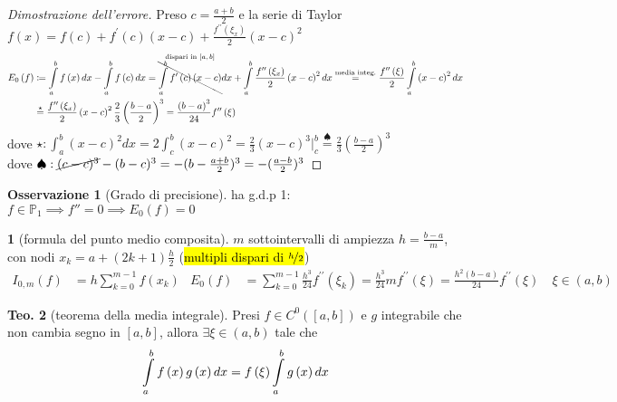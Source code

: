 \documentclass[a4paper,10pt]{article}
\theoremstyle{definition}
\theoremstyle{indentdefinition}
\theoremstyle{indenttheorem}
\newtheorem{thm}{Teo.}
\theoremstyle{myremark}
\newtheorem*{rem*}{Osservazione}
\theoremstyle{indentgeneral}
\newtheorem{lyxalgorithm}[thm]{\protect\algorithmname}
\theoremstyle{plain}
\theoremstyle{plain}
\begin{document}
\begin{proof}[Dimostrazione dell'errore]
Preso $c=\frac{a+b}{2}$ e la serie di Taylor $f\left(x\right)=f\left(c\right)+f^{\prime}\left(c\right)\left(x-c\right)+\frac{f^{\prime\prime}\left(\xi_{x}\right)}{2}\left(x-c\right)^{2}$
\begin{align*}
E_{0}\left(f\right)&\coloneqq\intop_{a}^{b}f\left(x\right)dx-\intop_{a}^{b}f\left(c\right)dx=\overset{\text{dispari in \ensuremath{\left[a,b\right]}}}{\bcancel{\intop_{a}^{b}f^{\prime}\left(c\right)\left(x-c\right)}}dx+\intop_{a}^{b}\frac{f^{\prime\prime}\left(\xi_{x}\right)}{2}\left(x-c\right)^{2}dx\overset{\text{media integ.}}{=}\frac{f^{\prime\prime}\left(\xi\right)}{2}\intop_{a}^{b}\left(x-c\right)^{2}dx\\
&\overset{\star}{=}\frac{f^{\prime\prime}\left(\xi_{x}\right)}{2}\left(x-c\right)^{2} \frac{2}{3}\left(\frac{b-a}{2}\right)^3=\frac{\left(b-a\right)^{3}}{24}f^{\prime\prime}\left(\xi\right)
\end{align*}
dove $\star: \int_a^b(x-c)^2dx=2\int_c^b(x-c)^2=\frac{2}{3}(x-c)^3|_c^b\overset{\spadesuit}{=} \frac{2}{3}\left(\frac{b-a}{2}\right)^3$ \\
dove $\spadesuit: \cancel{(c-c)^3}-(b-c)^3=-(b-\frac{a+b}{2})^3=-(\frac{a-b}{2})^3$
\end{proof}
\begin{rem*}[Grado di precisione] ha g.d.p 1: $f\in\mathbb{P}_1\implies f''=0\implies E_0(f)=0$
    
\end{rem*}
\begin{lyxalgorithm}[formula del punto medio composita] $m$ sottointervalli di ampiezza 
$h=\frac{b-a}{m}$, con nodi $x_{k}=a+\left(2k+1\right)\frac{h}{2}$ (\hl{multipli dispari di $\nicefrac{h}{2}$})
\begin{align*}
I_{0,m}\left(f\right) & =h\sum_{k=0}^{m-1}f\left(x_{k}\right) & E_{0}\left(f\right) & =\sum_{k=0}^{m-1}\frac{h^{3}}{24}f^{\prime\prime}\left(\xi_{k}\right)=\frac{h^{3}}{24}mf^{\prime\prime}\left(\xi\right)=\frac{h^{2}\left(b-a\right)}{24}f^{\prime\prime}\left(\xi\right)\quad\xi\in\left(a,b\right)
\end{align*}
\end{lyxalgorithm}

\begin{thm}[teorema della media integrale]
Presi $f\in C^{0}\left(\left[a,b\right]\right)$ e $g$ integrabile
che non cambia segno in $\left[a,b\right]$, allora $\exists\xi\in\left(a,b\right)$
tale che
\[
\intop_{a}^{b}f\left(x\right)g\left(x\right)dx=f\left(\xi\right)\intop_{a}^{b}g\left(x\right)dx
\]
\end{thm}
\end{document}
